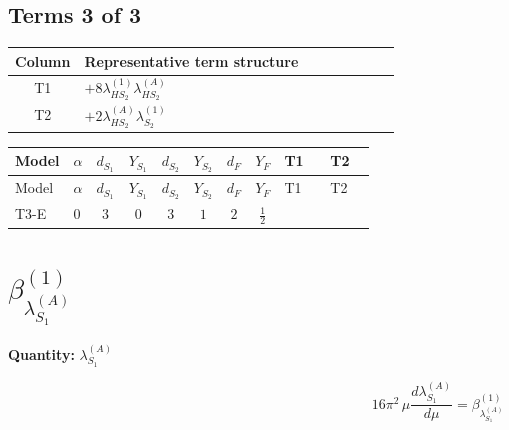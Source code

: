 \documentclass[8pt]{article}
\begin{document}
\begin{landscape}
\subsection*{Terms 3 of 3}
\begin{center}
\begin{tabular}{@{}c >{\raggedright\arraybackslash}p{0.82\linewidth}@{}}
\toprule
Column & Representative term structure \\
\midrule
T1 & \(\displaystyle +8 {\lambda_{HS_2}^{(1)}} {\lambda_{HS_2}^{(A)}}\) \\
\midrule
T2 & \(\displaystyle +2 {\lambda_{HS_2}^{(A)}} {\lambda_{S_2}^{(1)}}\) \\
\midrule
\bottomrule
\end{tabular}
\end{center}
\smallskip
\tiny
\begin{longtable}{@{}llcccccc >{\raggedright\arraybackslash}p{0.21\linewidth} >{\raggedright\arraybackslash}p{0.21\linewidth}@{}}
\toprule
Model & $\alpha$ & $d_{S_1}$ & $Y_{S_1}$ & $d_{S_2}$ & $Y_{S_2}$ & $d_F$ & $Y_F$ & T1 & T2 \\
\midrule
\endfirsthead
\toprule
Model & $\alpha$ & $d_{S_1}$ & $Y_{S_1}$ & $d_{S_2}$ & $Y_{S_2}$ & $d_F$ & $Y_F$ & T1 & T2 \\
\midrule
\endhead
T3-E & $0$ & $3$ & $0$ & $3$ & $1$ & $2$ & $\frac{1}{2}$ & \scriptsize\adjustbox{max width=\linewidth}{$\begin{gathered} +8 {\lambda_{HS_2}^{(1)}} {\lambda_{HS_2}^{(A)}}\end{gathered}$} & \scriptsize\adjustbox{max width=\linewidth}{$\begin{gathered} +2 {\lambda_{HS_2}^{(A)}} {\lambda_{S_2}^{(1)}}\end{gathered}$} \\
\midrule
\bottomrule
\end{longtable}
\clearpage
\section*{$\beta_{\lambda_{S_1}^{(A)}}^{(1)}$}
\noindent\textbf{Quantity: }$\lambda_{S_1}^{(A)}$\par\smallskip
\[16\pi^2\,\mu\frac{d \lambda_{S_1}^{(A)}}{d\mu}=\beta_{\lambda_{S_1}^{(A)}}^{(1)}\]

\end{landscape}
\end{document}
